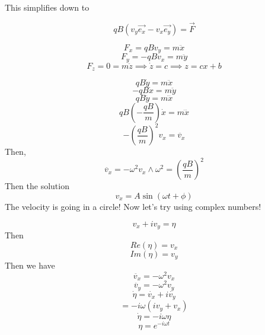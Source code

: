 \documentclass{article}
\newtheorem{one minute paper}[theorem]{One Minute Paper}
\begin{document}
This simplifies down to 

\begin{equation}
    qB(v_y\vec{e_x} - v_x\vec{e_y}) = \vec{F}
\end{equation}

\begin{equation}
    F_x = qBv_y = m\ddot{x}
\end{equation}
\begin{equation}
    F_y = -qBv_x = m\ddot{y}
\end{equation}
\begin{equation}
    F_z = 0 = m\ddot{z} \implies \dot{z} = c \implies z = cx + b
\end{equation}

\begin{equation}
    qB\dot{y} = m\ddot{x}
\end{equation}
\begin{equation}
    -qB\dot{x} = m\ddot{y}
\end{equation}
\begin{equation}
    qB\ddot{y} = m\dddot{x}
\end{equation}
\begin{equation}
    qB(-\frac{qB}{m})\dot{x} = m\dddot{x}
\end{equation}
\begin{equation}
    -(\frac{qB}{m})^2 v_x = \ddot{v_x}
\end{equation}
Then, 
\begin{equation}
    \ddot{v_x} = -\omega^2v_x \land \omega^2 = (\frac{qB}{m})^2
\end{equation}
Then the solution 
\begin{equation}
    v_x = A\sin(\omega t + \phi)
\end{equation}
The velocity is going in a circle! Now let's try using complex numbers!

\begin{equation}
    v_x + iv_y = \eta 
\end{equation}
Then 
\begin{equation}
    Re(\eta) = v_x
\end{equation}
\begin{equation}
    Im(\eta) = v_y
\end{equation}
Then we have 
\begin{equation}
    \ddot{v_x} = -\omega^2 v_x
\end{equation}
\begin{equation}
    \ddot{v_y} = -\omega^2 v_y
\end{equation}
\begin{equation}
    \dot{\eta} = \dot{v_x} + i\dot{v_y}
\end{equation}
\begin{equation}
     = -i\omega(iv_y + v_x)
\end{equation}
\begin{equation}
    \dot{\eta} = -i\omega\eta
\end{equation}
\begin{equation}
    \eta = e^{-i\omega t}
\end{equation}
\end{document}
